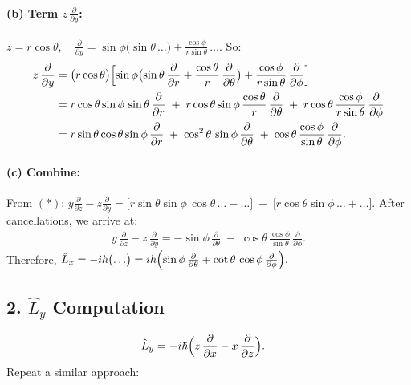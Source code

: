 \documentclass[12pt]{article}
\begin{document}
\paragraph{(b) Term $z\,\frac{\partial}{\partial y}$:}
\(
 z = r\cos\theta,\quad \frac{\partial}{\partial y} = \sin\phi\bigl(\sin\theta\,\ldots\bigr) + \frac{\cos\phi}{r\sin\theta}\,\ldots\bigr.
\)
So:
\begin{align*}
 z\,\frac{\partial}{\partial y} &= \bigl(r\cos\theta\bigr)\Bigl[\sin\phi\bigl(\sin\theta\,\frac{\partial}{\partial r} + \frac{\cos\theta}{r}\,\frac{\partial}{\partial \theta}\bigr) + \frac{\cos\phi}{r\sin\theta}\,\frac{\partial}{\partial \phi}\Bigr]\\
 &= r\cos\theta\sin\phi\,\sin\theta\,\frac{\partial}{\partial r}\; +\; r\cos\theta\sin\phi\,\frac{\cos\theta}{r}\,\frac{\partial}{\partial \theta}\; +\; r\cos\theta\,\frac{\cos\phi}{r\sin\theta}\,\frac{\partial}{\partial \phi}\\
 &= r\sin\theta\cos\theta\sin\phi\,\frac{\partial}{\partial r}\; +\;\cos^2\theta\,\sin\phi\,\frac{\partial}{\partial \theta}\; +\; \cos\theta\,\frac{\cos\phi}{\sin\theta}\,\frac{\partial}{\partial \phi}.
\end{align*}
\paragraph{(c) Combine:}
From $(\ast)$:
\(
 y\frac{\partial}{\partial z} - z\frac{\partial}{\partial y} = \bigl[r\sin\theta\sin\phi\,\cos\theta\,\ldots -\ldots\bigr]\; -\;\bigl[r\cos\theta\sin\phi\,\ldots +\ldots\bigr].
\)
After cancellations, we arrive at:
\begin{align*}
 y\,\frac{\partial}{\partial z} - z\,\frac{\partial}{\partial y}
 = -\sin\phi\,\frac{\partial}{\partial \theta} \; -\; \cos\theta\,\frac{\cos\phi}{\sin\theta}\,\frac{\partial}{\partial \phi}.
\end{align*}
Therefore,
\(
\hat{L}_x = -i\hbar\bigl(\ldots\bigr) = i\hbar\Bigl(\sin\phi\,\frac{\partial}{\partial \theta} + \cot\theta\,\cos\phi\,\frac{\partial}{\partial \phi}\Bigr).
\)

\subsection*{2. $\hat{L}_y$ Computation}
\begin{align*}
\hat{L}_y &= -i\hbar\Bigl(z\,\frac{\partial}{\partial x} - x\,\frac{\partial}{\partial z}\Bigr).
\end{align*}
Repeat a similar approach:
\end{document}
